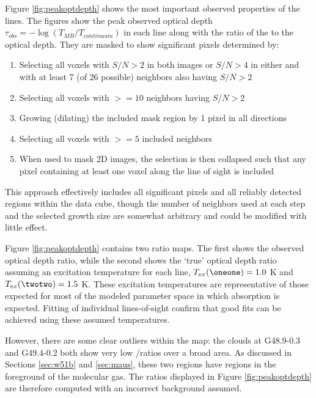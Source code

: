 Figure \ref{fig:peakoptdepth} shows the most important observed properties of
the \formaldehyde lines.  The figures show the peak observed optical depth
$\tau_{obs} = -\log(T_{MB}/T_{continuum})$ in each line along with the ratio of
the \oneone to the \twotwo optical depth.  They are masked to show significant
pixels determined by:
\begin{enumerate}
    \item Selecting all voxels with $S/N > 2$ in both images or $S/N > 4$ in
        either and with at least 7 (of 26 possible) neighbors also having $S/N > 2$ 
    \item Selecting all voxels with $>=10$ neighbors having $S/N > 2$
    \item Growing (dilating) the included mask region by 1 pixel in all
        directions
    \item Selecting all voxels with $>=5$ included neighbors
    \item When used to mask 2D images, the selection is then collapsed such
        that any pixel containing at least one voxel along the line of sight is
        included
\end{enumerate}
This approach effectively includes all significant pixels and all reliably
detected regions within the data cube, though the number of neighbors used at
each step and the selected growth size are somewhat arbitrary and could be
modified with little effect.

Figure \ref{fig:peakoptdepth} contains two ratio maps.  The first shows the
observed optical depth ratio, while the second shows the `true' optical depth
ratio assuming an excitation temperature for each line, $T_{ex}(\oneone) = 1.0$
K and $T_{ex}(\twotwo) = 1.5$ K.  These excitation temperatures are
representative of those expected for most of the modeled parameter space in
which absorption is expected.  Fitting of individual lines-of-sight confirm
that good fits can be achieved using these assumed temperatures.

However, there are some clear outliers within the map: the clouds at G48.9-0.3
and G49.4-0.2 both show very low \oneone/\twotwo ratios over a broad area.  As
discussed in Sections \ref{sec:w51b} and \ref{sec:maus}, these two regions have
\hii regions in the foreground of the molecular gas.  The ratios displayed in
Figure \ref{fig:peakoptdepth} are therefore computed with an incorrect
background assumed.


